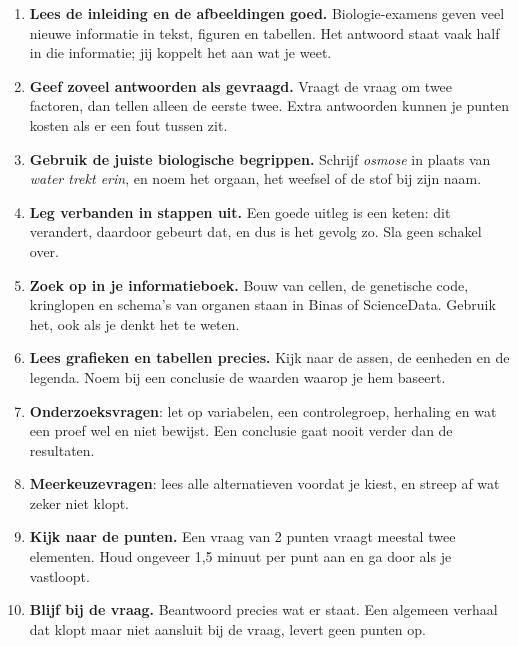 {\small\opmaakproza
\begin{enumerate}[leftmargin=1.5em,itemsep=3pt,label=\textcolor{kleur1}{\sffamily\bfseries\arabic*}]
\item \textbf{Lees de inleiding en de afbeeldingen goed.} Biologie-examens geven veel nieuwe informatie in tekst,
  figuren en tabellen. Het antwoord staat vaak half in die informatie; jij koppelt het aan wat je weet.
\item \textbf{Geef zoveel antwoorden als gevraagd.} Vraagt de vraag om twee factoren, dan tellen alleen de eerste twee.
  Extra antwoorden kunnen je punten kosten als er een fout tussen zit.
\item \textbf{Gebruik de juiste biologische begrippen.} Schrijf \emph{osmose} in plaats van \emph{water trekt erin},
  en noem het orgaan, het weefsel of de stof bij zijn naam.
\item \textbf{Leg verbanden in stappen uit.} Een goede uitleg is een keten: dit verandert, daardoor gebeurt dat,
  en dus is het gevolg zo. Sla geen schakel over.
\item \textbf{Zoek op in je informatieboek.} Bouw van cellen, de genetische code, kringlopen en schema's van
  organen staan in Binas of ScienceData. Gebruik het, ook als je denkt het te weten.
\item \textbf{Lees grafieken en tabellen precies.} Kijk naar de assen, de eenheden en de legenda. Noem bij een
  conclusie de waarden waarop je hem baseert.
\item \textbf{Onderzoeksvragen}: let op variabelen, een controlegroep, herhaling en wat een proef wel en niet bewijst.
  Een conclusie gaat nooit verder dan de resultaten.
\item \textbf{Meerkeuzevragen}: lees alle alternatieven voordat je kiest, en streep af wat zeker niet klopt.
\item \textbf{Kijk naar de punten.} Een vraag van 2 punten vraagt meestal twee elementen. Houd ongeveer
  1,5 minuut per punt aan en ga door als je vastloopt.
\item \textbf{Blijf bij de vraag.} Beantwoord precies wat er staat. Een algemeen verhaal dat klopt maar niet aansluit
  bij de vraag, levert geen punten op.
\end{enumerate}\par}

